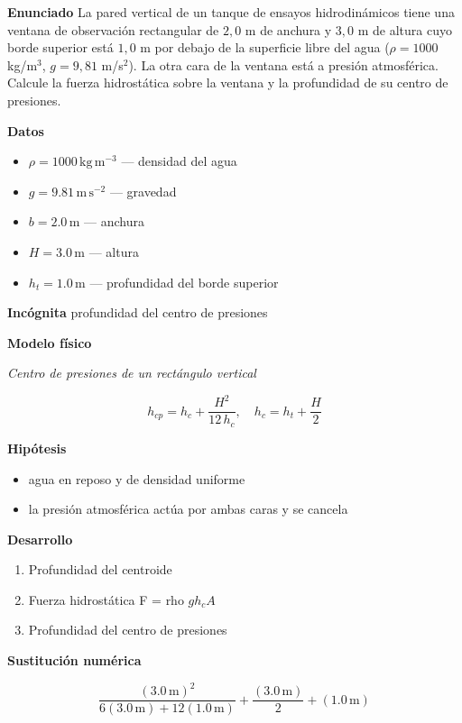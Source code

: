 \documentclass[10pt,openany]{book}
\begin{document}
\begin{tcolorbox}[title={Problema resuelto}, studiumworked, breakable]

\noindent\textbf{Enunciado}
La pared vertical de un tanque de ensayos hidrodinámicos tiene una ventana de observación rectangular de \(2{,}0\) m de anchura y \(3{,}0\) m de altura cuyo borde superior está \(1{,}0\) m por debajo de la superficie libre del agua (\(\rho = 1000\) kg/m\(^3\), \(g = 9{,}81\) m/s\(^2\)). La otra cara de la ventana está a presión atmosférica. Calcule la fuerza hidrostática sobre la ventana y la profundidad de su centro de presiones.

\noindent\textbf{Datos}
\begin{itemize}
\item $\rho = 1000\,\mathrm{kg}\,\mathrm{m}^{-3}$ — densidad del agua
\item $g = 9.81\,\mathrm{m}\,\mathrm{s}^{-2}$ — gravedad
\item $b = 2.0\,\mathrm{m}$ — anchura
\item $H = 3.0\,\mathrm{m}$ — altura
\item $h_{t} = 1.0\,\mathrm{m}$ — profundidad del borde superior
\end{itemize}

\noindent\textbf{Incógnita}
profundidad del centro de presiones

\noindent\textbf{Modelo físico}

\noindent\textit{Centro de presiones de un rectángulo vertical}

\[
h_{cp} = h_c + \frac{H^{2}}{12\,h_c},\quad h_c = h_t + \frac{H}{2}
\]

\noindent\textbf{Hipótesis}
\begin{itemize}
\item agua en reposo y de densidad uniforme
\item la presión atmosférica actúa por ambas caras y se cancela
\end{itemize}

\noindent\textbf{Desarrollo}
\begin{enumerate}
\item
Profundidad del centroide
\item
Fuerza hidrostática F = rho \(g h_c A\)
\item
Profundidad del centro de presiones
\end{enumerate}

\noindent\textbf{Sustitución numérica}

\[
\frac{\left(3.0\,\mathrm{m}\right)^{2}}{6 \left(3.0\,\mathrm{m}\right) + 12 \left(1.0\,\mathrm{m}\right)} + \frac{\left(3.0\,\mathrm{m}\right)}{2} + \left(1.0\,\mathrm{m}\right)
\]


\end{tcolorbox}
\end{document}
